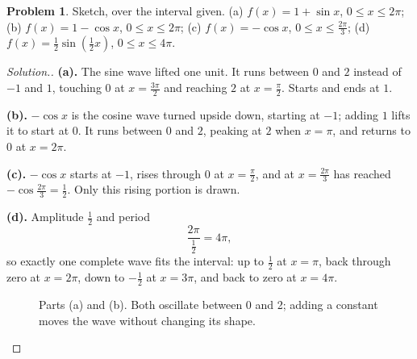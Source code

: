 \documentclass[11pt,a4paper]{article}
\theoremstyle{definition}
\newtheorem{problemx}{Problem}[section]
\newenvironment{problem}{\begin{problemx}}{\end{problemx}}
\newenvironment{solution}
  {\renewcommand{\qedsymbol}{}\begin{proof}[\textit{Solution}.]}
  {\end{proof}}
\begin{document}
\begin{problem}
Sketch, over the interval given.
\quad (a) $f(x)=1+\sin x$, $0\leq x\leq 2\pi$; \quad
(b) $f(x)=1-\cos x$, $0\leq x\leq 2\pi$; \quad
(c) $f(x)=-\cos x$, $0\leq x\leq\frac{2\pi}{3}$; \quad
(d) $f(x)=\frac{1}{2}\sin\left(\frac{1}{2}x\right)$, $0\leq x\leq 4\pi$.
\end{problem}

\begin{solution}
\textbf{(a).} The sine wave lifted one unit. It runs between $0$ and $2$ instead of
$-1$ and $1$, touching $0$ at $x=\frac{3\pi}{2}$ and reaching $2$ at
$x=\frac{\pi}{2}$. Starts and ends at $1$.

\textbf{(b).} $-\cos x$ is the cosine wave turned upside down, starting at $-1$; adding
$1$ lifts it to start at $0$. It runs between $0$ and $2$, peaking at $2$ when $x=\pi$,
and returns to $0$ at $x=2\pi$.

\textbf{(c).} $-\cos x$ starts at $-1$, rises through $0$ at $x=\frac{\pi}{2}$, and at
$x=\frac{2\pi}{3}$ has reached $-\cos\frac{2\pi}{3}=\frac{1}{2}$. Only this rising
portion is drawn.

\textbf{(d).} Amplitude $\frac{1}{2}$ and period
$$\frac{2\pi}{\frac{1}{2}}=4\pi,$$
so exactly one complete wave fits the interval: up to $\frac{1}{2}$ at $x=\pi$, back
through zero at $x=2\pi$, down to $-\frac{1}{2}$ at $x=3\pi$, and back to zero at
$x=4\pi$.

\begin{figure}[H]
\centering
{}
\caption{Parts (a) and (b). Both oscillate between 0 and 2; adding a constant moves the wave without changing its shape.}
\end{figure}


\end{solution}
\end{document}
